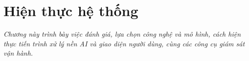 \chapter{Hiện thực hệ thống}
\label{chapter:hienthuc}

\textit{Chương này trình bày việc đánh giá, lựa chọn công nghệ và mô hình, cách hiện thực tiến trình xử lý nền AI và giao diện người dùng, cùng các công cụ giám sát vận hành.}





